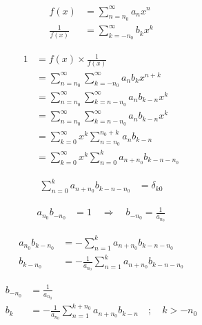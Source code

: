 \documentclass[a4paper,10pt,fleqn]{scrartcl}
\begin{document}
    \begin{align*}
        f(x) &= \sum\limits_{n=n_0}^\infty a_n x^n \\
        \frac1{f(x)} &= \sum\limits_{k=-n_0}^\infty b_k x^k
    \end{align*}

    \begin{align*}
        1
        &=
        f(x) \times \frac1{f(x)}
        \\
        &=
        \sum\limits_{n=n_0}^\infty
        \sum\limits_{k=-n_0}^\infty
        a_n
        b_k
        x^{n+k}
        \\
        &=
        \sum\limits_{n=n_0}^\infty
        \sum\limits_{k=n-n_0}^\infty
        a_n
        b_{k-n}
        x^k
        \\
        &=
        \sum\limits_{n=n_0}^\infty
        \sum\limits_{k=n-n_0}^\infty
        a_n
        b_{k-n}
        x^k
        \\
        &=
        \sum\limits_{k=0}^\infty
        x^k
        \sum\limits_{n=n_0}^{n_0+k}
        a_n
        b_{k-n}
        \\
        &=
        \sum\limits_{k=0}^\infty
        x^k
        \sum\limits_{n=0}^{k}
        a_{n+n_0}
        b_{k-n-n_0}
    \end{align*}

    \begin{align*}
        \sum\limits_{n=0}^{k}
        a_{n+n_0}
        b_{k-n-n_0}
        &=
        \delta_{k0}
    \end{align*}

    \begin{align*}
        a_{n_0}
        b_{-n_0}
        &=
        1
        \quad\Rightarrow\quad
        b_{-n_0} = \frac1{a_{n_0}}
    \end{align*}

    \begin{align*}
        a_{n_0}
        b_{k-n_0}
        &=
        -
        \sum\limits_{n=1}^{k}
        a_{n+n_0}
        b_{k-n-n_0}
        \\
        b_{k-n_0}
        &=
        -
        \frac1{a_{n_0}}
        \sum\limits_{n=1}^{k}
        a_{n+n_0}
        b_{k-n-n_0}
    \end{align*}

    \begin{align*}
        b_{-n_0} &= \frac1{a_{n_0}} \\
        b_{k}
        &=
        -
        \frac1{a_{n_0}}
        \sum\limits_{n=1}^{k+n_0}
        a_{n+n_0}
        b_{k-n}
        \quad;\quad k>-n_0
    \end{align*}
\end{document}
